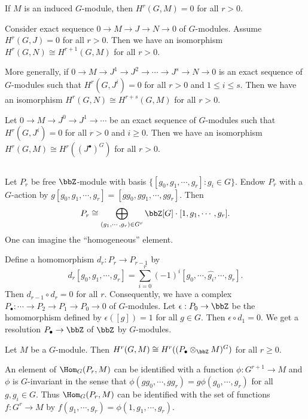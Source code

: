   \begin{corollary}
    If $M$ is an induced $G$-module, then $H^r(G, M) = 0$ for all $r > 0$.
  \end{corollary}

  \begin{remark}
    Consider exact sequence $0 \to M \to J \to N \to 0$ of $G$-modules.
    Assume $H^r(G, J) = 0$ for all $r > 0$.
    Then we have an isomorphism $H^r(G, N) \cong H^{r+1}(G, M)$ for all $r > 0$.

    More generally, if $0 \to M \to J^1 \to J^2 \to \cdots \to J^s \to N \to 0$ is an exact sequence of $G$-modules such that $H^r(G, J^i) = 0$ for all $r > 0$ and $1 \leq i \leq s$.
    Then we have an isomorphism $H^r(G, N) \cong H^{r+s}(G, M)$ for all $r > 0$.
  \end{remark}

  \begin{remark}
    Let $ 0 \to M \to J^0 \to J^1 \to \cdots$ be an exact sequence of $G$-modules such that $H^r(G, J^i) = 0$ for all $r > 0$ and $i \geq 0$.
    Then we have an isomorphism $H^r(G, M) \cong H^{r}((J^\bullet)^G)$ for all $r > 0$.
  \end{remark}



\subsection{}

  Let $P_r$ be free $\bbZ$-module with basis $\{ [g_0, g_1, \cdots, g_r] : g_i \in G \}$.
  Endow $P_r$ with a $G$-action by $g [g_0, g_1, \cdots, g_r] = [g g_0, g g_1, \cdots, g g_r]$.
  Then 
  \[ P_r \cong \bigoplus_{(g_1, \cdots, g_r) \in G^r} \bbZ[G] \cdot [1, g_1, \cdots, g_r]. \]
  One can imagine the ``homogeneous'' element.

  Define a homomorphism $d_r : P_r \to P_{r-1}$ by
  \[ d_r [g_0, g_1, \cdots, g_r] = \sum_{i=0}^r (-1)^i [g_0, \cdots, \hat{g_i}, \cdots, g_r]. \]
  Then $d_{r-1} \circ d_r = 0$ for all $r$.
  Consequently, we have a complex $P_\bullet : \cdots \to P_2 \to P_1 \to P_0 \to 0$ of $G$-modules.
  Let $\epsilon : P_0 \to \bbZ$ be the homomorphism defined by $\epsilon([g]) = 1$ for all $g \in G$.
  Then $\epsilon \circ d_1 = 0$.
  We get a resolution $P_\bullet \to \bbZ$ of $\bbZ$ by $G$-modules.


  \begin{proposition}
    Let $M$ be a $G$-module.
    Then $H^r(G, M) \cong H^r((P_\bullet \otimes_{\bbZ} M)^G)$ for all $r \geq 0$.
  \end{proposition}

  An element of $\Hom_G(P_r, M)$ can be identified with a function $\phi : G^{r+1} \to M$ and $\phi$ is $G$-invariant in the sense that $\phi(g g_0, \cdots, g g_r) = g \phi(g_0, \cdots, g_r)$ for all $g, g_i \in G$.
  Thus $\Hom_G(P_r, M)$ can be identified with the set of functions $f : G^r \to M$ by $f(g_1, \cdots, g_r) = \phi(1, g_1, \cdots, g_r)$.
  \Yang{}